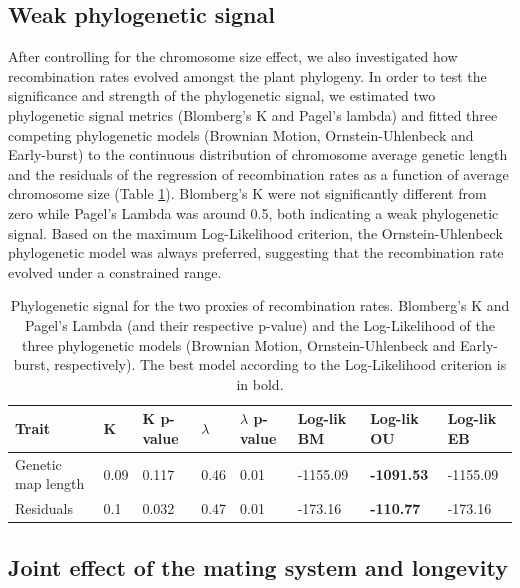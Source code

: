\documentclass{article}
\begin{document}
\subsection*{Weak phylogenetic signal}


After controlling for the chromosome size effect, we also investigated how recombination rates evolved amongst the plant phylogeny. In order to test the significance and strength of the phylogenetic signal, we estimated two phylogenetic signal metrics (Blomberg’s K and Pagel’s lambda) and fitted three competing phylogenetic models (Brownian Motion, Ornstein-Uhlenbeck and Early-burst) to the continuous distribution of chromosome average genetic length and the residuals of the regression of recombination rates as a function of average chromosome size (Table \ref{table:table1}). Blomberg's K were not significantly different from zero while Pagel's Lambda was around 0.5, both indicating a weak phylogenetic signal. Based on the maximum Log-Likelihood criterion, the Ornstein-Uhlenbeck phylogenetic model was always preferred, suggesting that the recombination rate evolved under a constrained range.


\begin{table}[h!]
\centering{}
\caption{Phylogenetic signal for the two proxies of recombination rates. Blomberg’s K and Pagel’s Lambda (and their respective p-value) and the Log-Likelihood of the three phylogenetic models (Brownian Motion, Ornstein-Uhlenbeck and Early-burst, respectively). The best model according to the Log-Likelihood criterion is in bold.}
\begin{tabular}{llllllll}
Trait                      & K    & K p-value & $\lambda$ & $\lambda$ p-value & Log-lik BM & Log-lik OU & Log-lik EB \\ \hline
Genetic map length & 0.09 & 0.117                                         & 0.46   & 0.01     & -1155.09   & \textbf{-1091.53}                                             & -1155.09                                             \\
Residuals                  & 0.1  & 0.032                                         & 0.47   & 0.01     & -173.16    & \textbf{-110.77}                                              & -173.16                                             
\end{tabular}
\label{table:table1}
\end{table}




\subsection*{Joint effect of the mating system and longevity}
\end{document}
